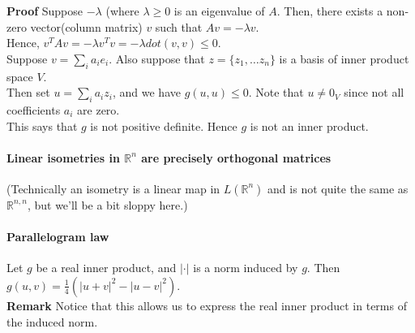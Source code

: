 \documentclass{article}
\begin{document}
\textbf{Proof} Suppose $-\lambda$ (where $\lambda \geq 0$ is an eigenvalue of $A$. Then, there exists a non-zero vector(column matrix) $v$ such that $Av=-\lambda v$.\\
Hence, $v^TAv = -\lambda v^Tv = -\lambda dot(v,v) \leq 0$.\\
Suppose $v=\sum_i a_ie_i$. Also suppose that $z=\{z_1,\dots z_n\}$ is a basis of inner product space $V$.\\
Then set $u=\sum_i a_iz_i$, and we have $g(u,u)\leq 0$. Note that $u\neq 0_V$ since not all coefficients $a_i$ are zero.\\
This says that $g$ is not positive definite. Hence $g$ is not an inner product.

\paragraph{Linear isometries in $\mathbb{R}^n$ are precisely orthogonal matrices}
(Technically an isometry is a linear map in $L(\mathbb{R}^n)$ and is not quite the same as $\mathbb{R}^{n,n}$, but we'll be a bit sloppy here.)

\paragraph{Parallelogram law} Let $g$ be a real inner product, and $|\cdot|$ is a norm induced by $g$. Then $g(u,v) = \frac{1}{4}(|u+v|^2-|u-v|^2)$.\\
\textbf{Remark} Notice that this allows us to express the real inner product in terms of the induced norm.
\end{document}
